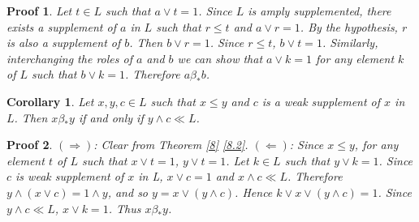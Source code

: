 \documentclass[a4paper,12pt]{article}
\numberwithin{equation}{section}
\theoremstyle{italik}
\newtheorem{sonuc}[teorem]{Corollary}
\newtheorem*{ispat}{Proof}
\begin{document}
\begin{ispat}
  Let $ t \in L $ such that $ a \vee t = 1 $. Since $ L $ is amply supplemented, there exists 
  a supplement of $ a $ in $ L $ such that $ r \leq t $ and $ a \vee r = 1 $. By the hypothesis, 
  $ r $ is also a supplement of $ b $. Then $ b \vee r = 1 $. Since $ r \leq t $, $ b \vee t = 1 $. 
  Similarly, interchanging the roles of $ a $ and $ b $ we can show that $ a \vee k = 1 $ for any 
  element $ k $ of $ L $ such that $ b \vee k = 1 $. Therefore $ a \beta_* b $.
\end{ispat}

\begin{sonuc}\label{10}
  Let $ x,y,c \in L $ such that $ x \leq y $ and $ c $ is a weak supplement of $ x $ in $ L $. Then 
  $ x \beta_* y $ if and only if $ y \wedge c \ll L $.
\end{sonuc}

\begin{ispat}
  $ ( \Rightarrow ) $: 
  Clear from Theorem \ref{8} \ref{8.2}.
  $ ( \Leftarrow ) $:  
  Since $ x \leq y $, for any element $ t $ of $ L $ such that $ x \vee t = 1 $, $ y \vee t = 1 $. 
  Let $ k \in L $ such that $ y \vee k = 1 $. Since $ c $ is weak supplement of $ x $ in L, 
  $ x \vee c = 1 $ and $ x \wedge c \ll L $. Therefore $ y \wedge ( x \vee c ) = 1 \wedge y $, and so 
  $ y = x \vee ( y \wedge c ) $. Hence $ k \vee x \vee ( y \wedge c ) = 1 $. Since $ y \wedge c \ll L $, 
  $ x \vee k = 1 $. Thus $ x \beta_* y $.
\end{ispat}

\end{document}
